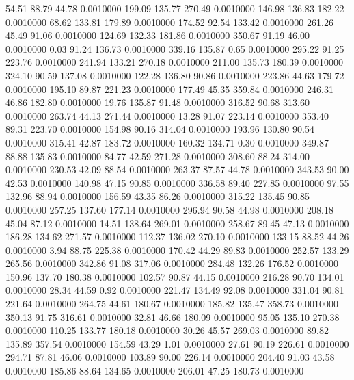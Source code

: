   54.51   88.79   44.78   0.0010000
 199.09  135.77  270.49   0.0010000
 146.98  136.83  182.22   0.0010000
  68.62  133.81  179.89   0.0010000
 174.52   92.54  133.42   0.0010000
 261.26   45.49   91.06   0.0010000
 124.69  132.33  181.86   0.0010000
 350.67   91.19   46.00   0.0010000
   0.03   91.24  136.73   0.0010000
 339.16  135.87    0.65   0.0010000
 295.22   91.25  223.76   0.0010000
 241.94  133.21  270.18   0.0010000
 211.00  135.73  180.39   0.0010000
 324.10   90.59  137.08   0.0010000
 122.28  136.80   90.86   0.0010000
 223.86   44.63  179.72   0.0010000
 195.10   89.87  221.23   0.0010000
 177.49   45.35  359.84   0.0010000
 246.31   46.86  182.80   0.0010000
  19.76  135.87   91.48   0.0010000
 316.52   90.68  313.60   0.0010000
 263.74   44.13  271.44   0.0010000
  13.28   91.07  223.14   0.0010000
 353.40   89.31  223.70   0.0010000
 154.98   90.16  314.04   0.0010000
 193.96  130.80   90.54   0.0010000
 315.41   42.87  183.72   0.0010000
 160.32  134.71    0.30   0.0010000
 349.87   88.88  135.83   0.0010000
  84.77   42.59  271.28   0.0010000
 308.60   88.24  314.00   0.0010000
 230.53   42.09   88.54   0.0010000
 263.37   87.57   44.78   0.0010000
 343.53   90.00   42.53   0.0010000
 140.98   47.15   90.85   0.0010000
 336.58   89.40  227.85   0.0010000
  97.55  132.96   88.94   0.0010000
 156.59   43.35   86.26   0.0010000
 315.22  135.45   90.85   0.0010000
 257.25  137.60  177.14   0.0010000
 296.94   90.58   44.98   0.0010000
 208.18   45.04   87.12   0.0010000
  14.51  138.64  269.01   0.0010000
 258.67   89.45   47.13   0.0010000
 186.28  134.62  271.57   0.0010000
 112.37  136.02  270.10   0.0010000
 133.15   88.52   44.26   0.0010000
   3.94   88.75  225.38   0.0010000
 170.42   44.29   89.83   0.0010000
 252.57  133.29  265.56   0.0010000
 342.86   91.08  317.06   0.0010000
 284.48  132.26  176.52   0.0010000
 150.96  137.70  180.38   0.0010000
 102.57   90.87   44.15   0.0010000
 216.28   90.70  134.01   0.0010000
  28.34   44.59    0.92   0.0010000
 221.47  134.49   92.08   0.0010000
 331.04   90.81  221.64   0.0010000
 264.75   44.61  180.67   0.0010000
 185.82  135.47  358.73   0.0010000
 350.13   91.75  316.61   0.0010000
  32.81   46.66  180.09   0.0010000
  95.05  135.10  270.38   0.0010000
 110.25  133.77  180.18   0.0010000
  30.26   45.57  269.03   0.0010000
  89.82  135.89  357.54   0.0010000
 154.59   43.29    1.01   0.0010000
  27.61   90.19  226.61   0.0010000
 294.71   87.81   46.06   0.0010000
 103.89   90.00  226.14   0.0010000
 204.40   91.03   43.58   0.0010000
 185.86   88.64  134.65   0.0010000
 206.01   47.25  180.73   0.0010000
